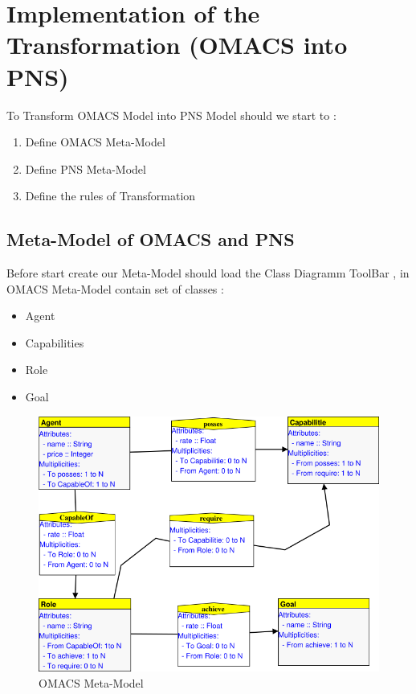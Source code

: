  

\section{Implementation of the Transformation (OMACS into PNS)\label{sec:OMACS into PNS} }%
To Transform OMACS Model into PNS Model should we start to :
\begin{enumerate}
\item Define OMACS Meta-Model 
\item Define PNS Meta-Model
\item Define the rules of Transformation
\end{enumerate}


\subsection{ Meta-Model of OMACS  and PNS } 
Before start create our Meta-Model should load the Class Diagramm ToolBar ,
in OMACS Meta-Model contain set of classes :

\begin{itemize}

\item Agent  
\item Capabilities
\item Role
\item Goal

\end{itemize}
 
\begin{figure}[th]
		\centering
 	\includegraphics[scale=0.7]{Chapiter3/img/omacs_meta}
	\caption{\label{fig:OMACS Meta-Model}OMACS Meta-Model}
\end{figure} 
 
